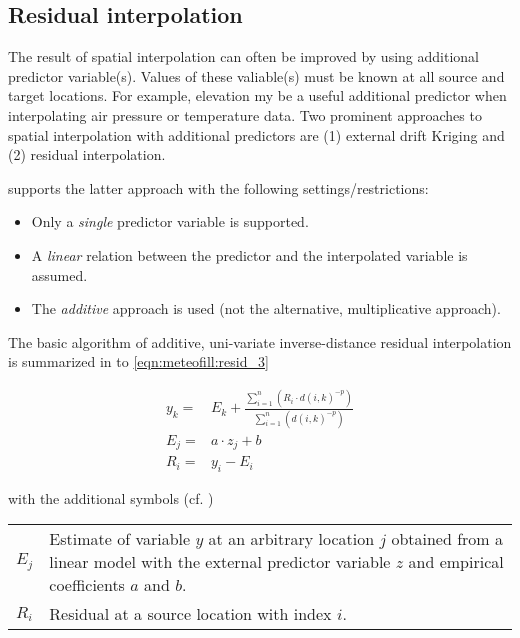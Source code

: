 \subsection{Residual interpolation} \label{sec:meteofill:resid}

The result of spatial interpolation can often be improved by using additional predictor variable(s). Values of these valiable(s) must be known at all source and target locations. For example, elevation my be a useful additional predictor when interpolating air pressure or temperature data. Two prominent approaches to spatial interpolation with additional predictors are (1) external drift Kriging and (2) residual interpolation.

 supports the latter approach with the following settings/restrictions:
\begin{itemize}
  \item Only a \emph{single} predictor variable is supported.
  \item A \emph{linear} relation between the predictor and the interpolated variable is assumed.
  \item The \emph{additive} approach is used (not the alternative, multiplicative approach).
\end{itemize}

The basic algorithm of additive, uni-variate inverse-distance residual interpolation is summarized in  to \ref{eqn:meteofill:resid_3}

\begin{align}
y_k =& E_k + \frac{\sum_{i=1}^{n} \left( R_i \cdot d(i,k)^{-p}\right)}{\sum_{i=1}^{n} \left( d(i,k)^{-p} \right)} \label{eqn:meteofill:resid_1} \\
E_j =& a \cdot z_j + b \label{eqn:meteofill:resid_2} \\
R_i =& y_i - E_i \label{eqn:meteofill:resid_3}
\end{align}

with the additional symbols (cf. )

\begin{tabular}{lp{}}
  $E_j$ & Estimate of variable $y$ at an arbitrary location $j$ obtained from a linear model with the external predictor variable $z$ and empirical coefficients $a$ and $b$.  \\
  $R_i$ & Residual at a source location with index $i$. \\
\end{tabular}

